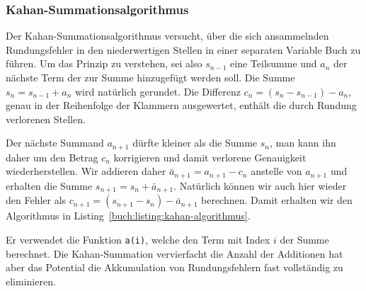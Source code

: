 \subsubsection{Kahan-Summationsalgorithmus}
Der Kahan-Summationsalgorithmus versucht, über die sich ansammelnden
%
Rundungsfehler in den niederwertigen Stellen in einer separaten 
Variable Buch zu führen.
Um das Prinzip zu verstehen, sei also $s_{n-1}$ eine Teilsumme und $a_n$ der
nächste Term der zur Summe hinzugefügt werden soll. 
Die Summe $s_n=s_{n-1} + a_n$ wird natürlich gerundet.
Die Differenz $c_n = (s_n - s_{n-1}) - a_n$, genau in der Reihenfolge
der Klammern ausgewertet, enthält die durch Rundung verlorenen Stellen.

Der nächste Summand $a_{n+1}$ dürfte kleiner als die Summe $s_{n}$, 
man kann ihn daher um den Betrag $c_n$ korrigieren und damit verlorene
Genauigkeit wiederherstellen.
Wir addieren daher $\bar a_{n+1} = a_{n+1}-c_n$ anstelle von $a_{n+1}$
und erhalten die Summe $s_{n+1} = s_n + \bar{a}_{n+1}$.
Natürlich können wir auch hier wieder den Fehler als
$c_{n+1} = (s_{n+1} - s_{n}) - \bar{a}_{n+1}$ berechnen.
Damit erhalten wir den Algorithmus in
Listing~\ref{buch:listing:kahan-algorithmus}.

Er verwendet die Funktion \texttt{a(i)}, welche den Term mit Index $i$
der Summe berechnet.
Die Kahan-Summation vervierfacht die Anzahl der Additionen hat aber das
Potential die Akkumulation von Rundungsfehlern fast vollständig zu 
eliminieren.
%

